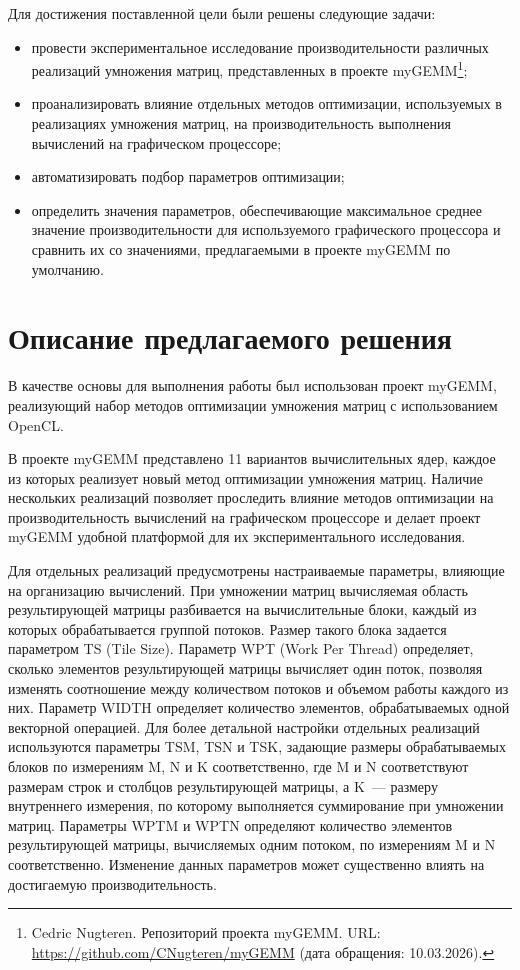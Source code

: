 \documentclass[a4paper]{article}
\begin{document}
Для достижения поставленной цели были решены следующие задачи:
\begin{itemize}
\item провести экспериментальное исследование производительности различных реализаций умножения матриц, представленных в проекте myGEMM\footnote{Cedric Nugteren. Репозиторий проекта myGEMM. URL: \url{https://github.com/CNugteren/myGEMM} (дата обращения: 10.03.2026).};
\item проанализировать влияние отдельных методов оптимизации, используемых в реализациях умножения матриц, на производительность выполнения вычислений на графическом процессоре;
\item автоматизировать подбор параметров оптимизации;
\item определить значения параметров, обеспечивающие максимальное среднее значение производительности для используемого графического процессора и сравнить их со значениями, предлагаемыми в проекте myGEMM по умолчанию.
\end{itemize}

\section{Описание предлагаемого решения}

В качестве основы для выполнения работы был использован проект myGEMM, реализующий набор методов оптимизации умножения матриц с использованием OpenCL.

В проекте myGEMM представлено 11 вариантов вычислительных ядер, каждое из которых реализует новый метод оптимизации умножения матриц. Наличие нескольких реализаций позволяет проследить влияние методов оптимизации на производительность вычислений на графическом процессоре и делает проект myGEMM удобной платформой для их экспериментального исследования.

Для отдельных реализаций предусмотрены настраиваемые параметры, влияющие на организацию вычислений. При умножении матриц вычисляемая область результирующей матрицы разбивается на вычислительные блоки, каждый из которых обрабатывается группой потоков. Размер такого блока задается параметром TS (Tile Size). Параметр WPT (Work Per Thread) определяет, сколько элементов результирующей матрицы вычисляет один поток, позволяя изменять соотношение между количеством потоков и объемом работы каждого из них. Параметр WIDTH определяет количество элементов, обрабатываемых одной векторной операцией. Для более детальной настройки отдельных реализаций используются параметры TSM, TSN и TSK, задающие размеры обрабатываемых блоков по измерениям M, N и K соответственно, где M и N соответствуют размерам строк и столбцов результирующей матрицы, а K~--- размеру внутреннего измерения, по которому выполняется суммирование при умножении матриц. Параметры WPTM и WPTN определяют количество элементов результирующей матрицы, вычисляемых одним потоком, по измерениям M и N соответственно. Изменение данных параметров может существенно влиять на достигаемую производительность.
\end{document}
